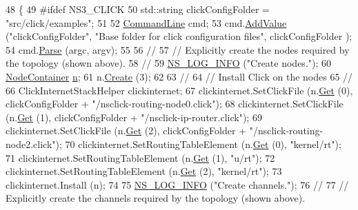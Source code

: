 \begin{DoxyCode}
48 \{
49 \textcolor{preprocessor}{#ifdef NS3\_CLICK}
50   std::string clickConfigFolder = \textcolor{stringliteral}{"src/click/examples"};
51 
52   \hyperlink{classns3_1_1CommandLine}{CommandLine} cmd;
53   cmd.\hyperlink{classns3_1_1CommandLine_addcfb546c7ad4c8bd0965654d55beb8e}{AddValue} (\textcolor{stringliteral}{"clickConfigFolder"}, \textcolor{stringliteral}{"Base folder for click configuration files"}, clickConfigFolder
      );
54   cmd.\hyperlink{classns3_1_1CommandLine_a5c10b85b3207e5ecb48d907966923156}{Parse} (argc, argv);
55 
56 \textcolor{comment}{//}
57 \textcolor{comment}{// Explicitly create the nodes required by the topology (shown above).}
58 \textcolor{comment}{//}
59   \hyperlink{group__logging_gafbd73ee2cf9f26b319f49086d8e860fb}{NS\_LOG\_INFO} (\textcolor{stringliteral}{"Create nodes."});
60   \hyperlink{classns3_1_1NodeContainer}{NodeContainer} \hyperlink{namespacesample-rng-plot_aeb5ee5c431e338ef39b7ac5431242e1d}{n};
61   n.\hyperlink{classns3_1_1NodeContainer_a787f059e2813e8b951cc6914d11dfe69}{Create} (3);
62 
63 \textcolor{comment}{//}
64 \textcolor{comment}{// Install Click on the nodes}
65 \textcolor{comment}{//}
66   ClickInternetStackHelper clickinternet;
67   clickinternet.SetClickFile (n.\hyperlink{classns3_1_1NodeContainer_a9ed96e2ecc22e0f5a3d4842eb9bf90bf}{Get} (0), clickConfigFolder + \textcolor{stringliteral}{"/nsclick-routing-node0.click"});
68   clickinternet.SetClickFile (n.\hyperlink{classns3_1_1NodeContainer_a9ed96e2ecc22e0f5a3d4842eb9bf90bf}{Get} (1), clickConfigFolder + \textcolor{stringliteral}{"/nsclick-ip-router.click"});
69   clickinternet.SetClickFile (n.\hyperlink{classns3_1_1NodeContainer_a9ed96e2ecc22e0f5a3d4842eb9bf90bf}{Get} (2), clickConfigFolder + \textcolor{stringliteral}{"/nsclick-routing-node2.click"});
70   clickinternet.SetRoutingTableElement (n.\hyperlink{classns3_1_1NodeContainer_a9ed96e2ecc22e0f5a3d4842eb9bf90bf}{Get} (0), \textcolor{stringliteral}{"kernel/rt"});
71   clickinternet.SetRoutingTableElement (n.\hyperlink{classns3_1_1NodeContainer_a9ed96e2ecc22e0f5a3d4842eb9bf90bf}{Get} (1), \textcolor{stringliteral}{"u/rt"});
72   clickinternet.SetRoutingTableElement (n.\hyperlink{classns3_1_1NodeContainer_a9ed96e2ecc22e0f5a3d4842eb9bf90bf}{Get} (2), \textcolor{stringliteral}{"kernel/rt"});
73   clickinternet.Install (n);
74 
75   \hyperlink{group__logging_gafbd73ee2cf9f26b319f49086d8e860fb}{NS\_LOG\_INFO} (\textcolor{stringliteral}{"Create channels."});
76 \textcolor{comment}{//}
77 \textcolor{comment}{// Explicitly create the channels required by the topology (shown above).}

\end{DoxyCode}
